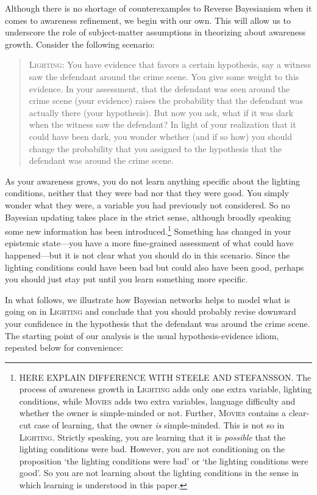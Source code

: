\documentclass[
  11pt,
  dvipsnames,enabledeprecatedfontcommands]{scrartcl}
\begin{document}
Although there is no shortage of counterexamples to Reverse Bayesianism
when it comes to awareness refinement, we begin with our own. This will
allow us to underscore the role of subject-matter assumptions in
theorizing about awareness growth. Consider the following scenario:

\begin{quote}
\textsc{Lighting:} You have evidence that favors a certain hypothesis, say a witness 
saw the defendant around the crime scene. You give some weight to this evidence. 
In your assessment, that the defendant was seen around the crime scene (your evidence) raises the probability that the defendant was actually there (your hypothesis). But now you ask, what if it was dark when the witness saw the defendant? In light of your realization that it could have been dark, you wonder whether (and if so how) you should change the probability that you assigned to the hypothesis that the defendant was around the crime scene.
\end{quote}

As your awareness grows, you do not learn anything specific about the
lighting conditions, neither that they were bad nor that they were good.
You simply wonder what they were, a variable you had previously not
considered. So no Bayesian updating takes place in the strict sense,
although broadly speaking some new information has been
introduced.\footnote{HERE EXPLAIN DIFFERENCE WITH STEELE AND STEFANSSON.
  The process of awareness growth in \textsc{Lighting} adds only one
  extra variable, lighting conditions, while \textsc{Movies} adds two
  extra variables, language difficulty and whether the owner is
  simple-minded or not. Further, \textsc{Movies} contains a clear-cut
  case of learning, that the owner \emph{is} simple-minded. This is not
  so in \textsc{Lighting}. Strictly speaking, you are learning that it
  is \emph{possible} that the lighting conditions were bad. However, you
  are not conditioning on the proposition `the lighting conditions were
  bad' or `the lighting conditions were good'. So you are not learning
  about the lighting conditions in the sense in which learning is
  understood in this paper.} Something has changed in your epistemic
state---you have a more fine-grained assessment of what could have
happened---but it is not clear what you should do in this scenario.
Since the lighting conditions could have been bad but could also have
been good, perhaps you should just stay put until you learn something
more specific.

In what follows, we illustrate how Bayesian networks helps to model what
is going on in \textsc{Lighting} and conclude that you should probably
revise downward your confidence in the hypothesis that the defendant was
around the crime scene. The starting point of our analysis is the usual
hypothesis-evidence idiom, repeated below for convenience:
\end{document}
